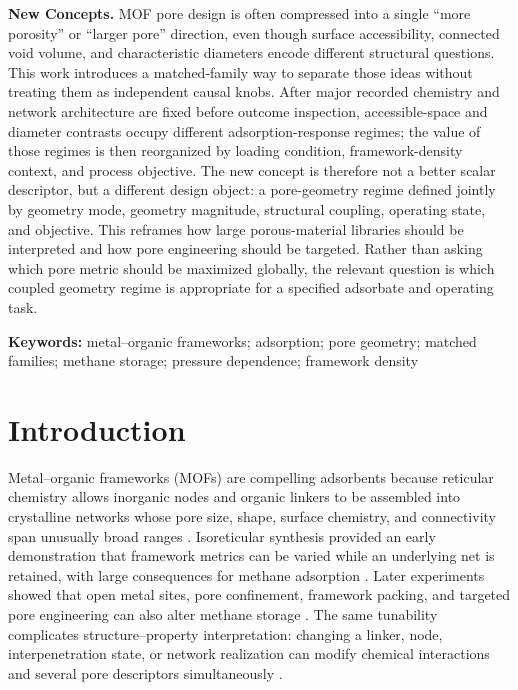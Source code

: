 \documentclass[11pt,a4paper]{article}
\begin{document}
\noindent\textbf{New Concepts.} MOF pore design is often compressed into a single ``more porosity'' or ``larger pore'' direction, even though surface accessibility, connected void volume, and characteristic diameters encode different structural questions. This work introduces a matched-family way to separate those ideas without treating them as independent causal knobs. After major recorded chemistry and network architecture are fixed before outcome inspection, accessible-space and diameter contrasts occupy different adsorption-response regimes; the value of those regimes is then reorganized by loading condition, framework-density context, and process objective. The new concept is therefore not a better scalar descriptor, but a different design object: a pore-geometry regime defined jointly by geometry mode, geometry magnitude, structural coupling, operating state, and objective. This reframes how large porous-material libraries should be interpreted and how pore engineering should be targeted. Rather than asking which pore metric should be maximized globally, the relevant question is which coupled geometry regime is appropriate for a specified adsorbate and operating task.


\noindent\textbf{Keywords:} metal--organic frameworks; adsorption; pore geometry;
matched families; methane storage; pressure dependence; framework density

\section{Introduction}

Metal--organic frameworks (MOFs) are compelling adsorbents because reticular
chemistry allows inorganic nodes and organic linkers to be assembled into
crystalline networks whose pore size, shape, surface chemistry, and connectivity
span unusually broad ranges \cite{furukawa2013chemistry}. Isoreticular synthesis
provided an early demonstration that framework metrics can be varied while an
underlying net is retained, with large consequences for methane adsorption
\cite{eddaoudi2002isoreticular}. Later experiments showed that open metal sites,
pore confinement, framework packing, and targeted pore engineering can also alter
methane storage \cite{wu2009opensites,gandara2014al,liang2017poregeometry}. The
same tunability complicates structure--property interpretation: changing a linker,
node, interpenetration state, or network realization can modify chemical
interactions and several pore descriptors simultaneously
\cite{ji2020porechemistry}.
\end{document}
